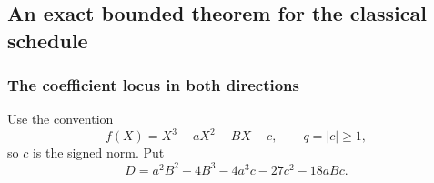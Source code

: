 \documentclass[11pt,a4paper]{article}
\theoremstyle{definition}\newtheorem{definition}[theorem]{Definition}
\theoremstyle{remark}\newtheorem{remark}[theorem]{Remark}
\begin{document}
\subsection{An exact bounded theorem for the classical schedule}
\label{R03:sec:real}

\subsubsection{The coefficient locus in both directions}

Use the convention
\begin{equation}\label{R03:eq:realpoly}
 f(X)=X^3-aX^2-BX-c,\qquad q=|c|\ge1,
\end{equation}
so $c$ is the signed norm. Put
\begin{equation}\label{R03:eq:realdisc}
 D=a^2B^2+4B^3-4a^3c-27c^2-18aBc.
\end{equation}
\end{document}
